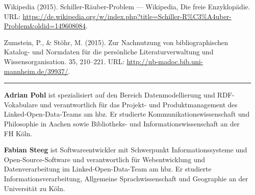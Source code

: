 \documentclass[a4paper,
fontsize=11pt,
oneside,
numbers=noperiodatend,
parskip=half-,
bibliography=totoc,
final
]{scrartcl}
\begin{document}
Wikipedia (2015). Schiller-Räuber-Problem --- Wikipedia, Die freie
Enzyklopädie. URL:
\url{https://de.wikipedia.org/w/index.php?title=Schiller-R\%C3\%A4uber-Problem\&oldid=149608084}.

Zumstein, P., \& Stöhr, M. (2015). Zur Nachnutzung von bibliographischen
Katalog- und Normdaten für die persönliche Literaturverwaltung und
Wissensorganisation. 35, 210--221. URL:
\url{http://ub-madoc.bib.uni-mannheim.de/39937/}.

\begin{center}\rule{0.5\linewidth}{\linethickness}\end{center}

\textbf{Adrian Pohl} ist spezialisiert auf den Bereich Datenmodellierung
und RDF-Vokabulare und verantwortlich für das Projekt- und
Produktmanagement des Linked-Open-Data-Teams am hbz. Er studierte
Kommunikationswissenschaft und Philosophie in Aachen sowie Bibliotheks-
und Informationswissenschaft an der FH Köln.

\textbf{Fabian Steeg} ist Softwareentwickler mit Schwerpunkt
Informationssysteme und Open-Source-Software und verantwortlich für
Webentwicklung und Datenverarbeitung im Linked-Open-Data-Team am hbz. Er
studierte Informationsverarbeitung, Allgemeine Sprachwissenschaft und
Geographie an der Universität zu Köln.
\end{document}
